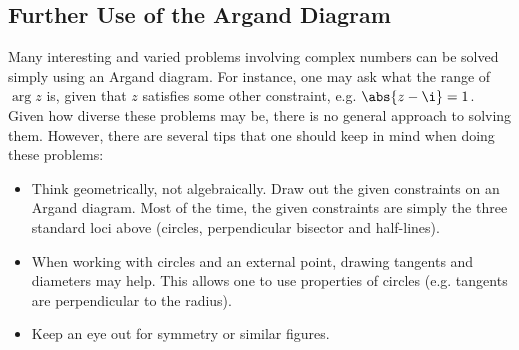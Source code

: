 \subsection{Further Use of the Argand Diagram}

Many interesting and varied problems involving complex numbers can be solved simply using an Argand diagram. For instance, one may ask what the range of $\arg z$ is, given that $z$ satisfies some other constraint, e.g. $\abs{z - \i} = 1$. Given how diverse these problems may be, there is no general approach to solving them. However, there are several tips that one should keep in mind when doing these problems:
\begin{itemize}
    \item Think geometrically, not algebraically. Draw out the given constraints on an Argand diagram. Most of the time, the given constraints are simply the three standard loci above (circles, perpendicular bisector and half-lines).
    \item When working with circles and an external point, drawing tangents and diameters may help. This allows one to use properties of circles (e.g. tangents are perpendicular to the radius).
    \item Keep an eye out for symmetry or similar figures.
\end{itemize}